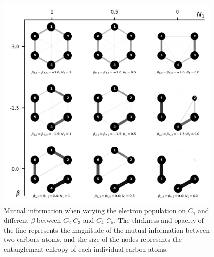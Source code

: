 \documentclass[twoside,twocolumn,9pt]{article}
\begin{document}
\begin{center}
  \begin{figure}[!htbp]
      \includegraphics[width=\textwidth]{Benzene-correlation-potential-and-two-betas-to-zero-not-adjacent.png}
      \caption{Mutual information when varying the electron population on $C_1$ and different $\beta$ between $C_2$-$C_3$ and $C_4$-$C_5$.  The thickness and opacity of the line represents the magnitude of the mutual information between two carbons atoms, and the size of the nodes represents the entanglement entropy of each individual carbon atoms.}
      \label{Diels-alder-2-correlation}
  \end{figure}
\end{center}
 
\newpage
\appendix 
\end{document}
